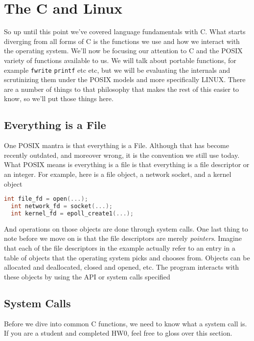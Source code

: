 \section{The C and Linux}

So up until this point we've covered language fundamentals with C.
What starts diverging from all forms of C is the functions we use and how we interact with the operating system.
We'll now be focusing our attention to C and the POSIX variety of functions available to us.
We will talk about portable functions, for example \texttt{fwrite} \texttt{printf} etc etc, but we will be evaluating the internals and scrutinizing them under the POSIX models and more specifically LINUX. There are a number of things to that philosophy that makes the rest of this easier to know, so we'll put those things here.

\subsection{Everything is a File}

One POSIX mantra is that everything is a File.
Although that has become recently outdated, and moreover wrong, it is the convention we still use today.
What POSIX means is everything is a file is that everything is a file descriptor or an integer. For example, here is a file object, a network socket, and a kernel object

\begin{lstlisting}[language=C]
  int file_fd = open(...);
  int network_fd = socket(...);
  int kernel_fd = epoll_create1(...);
\end{lstlisting}

And operations on those objects are done through system calls.
One last thing to note before we move on is that the file descriptors are merely \textit{pointers}.
Imagine that each of the file descriptors in the example actually refer to an entry in a table of objects that the operating system picks and chooses from.
Objects can be allocated and deallocated, closed and opened, etc.
The program interacts with these objects by using the API or system calls specified

\subsection{System Calls}

Before we dive into common C functions, we need to know what a system call is.
If you are a student and completed HW0, feel free to gloss over this section.

